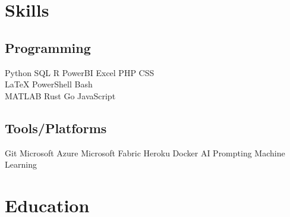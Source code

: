 \documentclass[]{plushcv}
\begin{document}
\begin{paracol}{2}

%
%

\switchcolumn[1]



\section{Skills}
\subsection{Programming}
\sectionsep
{}
Python \textbullet{} SQL \textbullet{} R \textbullet{} PowerBI \textbullet{} Excel \textbullet{} PHP \textbullet{} CSS \\
\sectionsep
{}
\LaTeX \textbullet{}  PowerShell \textbullet{}  Bash \\
\sectionsep
{}
MATLAB \textbullet{} Rust \textbullet{} Go \textbullet{} JavaScript \\
\sectionsep
\sectionsep
\subsection{Tools/Platforms}
\sectionsep
Git \textbullet{} Microsoft Azure \textbullet{} Microsoft Fabric \textbullet{} Heroku \textbullet{} Docker \textbullet{} AI Prompting \textbullet{} Machine Learning \\

\sectionsep


\section{Education} 

\end{paracol}
\end{document}
